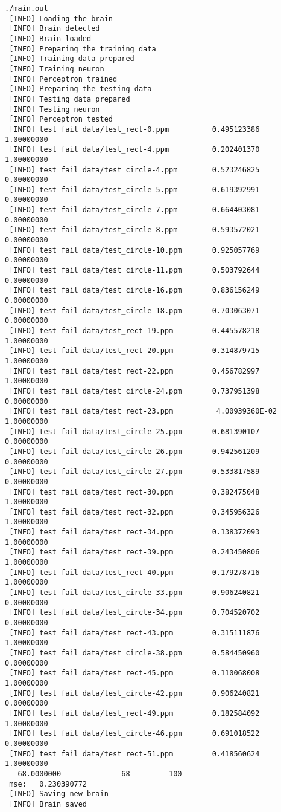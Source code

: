 \begin{verbatim}
./main.out
 [INFO] Loading the brain
 [INFO] Brain detected
 [INFO] Brain loaded
 [INFO] Preparing the training data
 [INFO] Training data prepared
 [INFO] Training neuron
 [INFO] Perceptron trained
 [INFO] Preparing the testing data
 [INFO] Testing data prepared
 [INFO] Testing neuron
 [INFO] Perceptron tested
 [INFO] test fail data/test_rect-0.ppm          0.495123386       1.00000000    
 [INFO] test fail data/test_rect-4.ppm          0.202401370       1.00000000    
 [INFO] test fail data/test_circle-4.ppm        0.523246825       0.00000000    
 [INFO] test fail data/test_circle-5.ppm        0.619392991       0.00000000    
 [INFO] test fail data/test_circle-7.ppm        0.664403081       0.00000000    
 [INFO] test fail data/test_circle-8.ppm        0.593572021       0.00000000    
 [INFO] test fail data/test_circle-10.ppm       0.925057769       0.00000000    
 [INFO] test fail data/test_circle-11.ppm       0.503792644       0.00000000    
 [INFO] test fail data/test_circle-16.ppm       0.836156249       0.00000000    
 [INFO] test fail data/test_circle-18.ppm       0.703063071       0.00000000    
 [INFO] test fail data/test_rect-19.ppm         0.445578218       1.00000000    
 [INFO] test fail data/test_rect-20.ppm         0.314879715       1.00000000    
 [INFO] test fail data/test_rect-22.ppm         0.456782997       1.00000000    
 [INFO] test fail data/test_circle-24.ppm       0.737951398       0.00000000    
 [INFO] test fail data/test_rect-23.ppm          4.00939360E-02   1.00000000    
 [INFO] test fail data/test_circle-25.ppm       0.681390107       0.00000000    
 [INFO] test fail data/test_circle-26.ppm       0.942561209       0.00000000    
 [INFO] test fail data/test_circle-27.ppm       0.533817589       0.00000000    
 [INFO] test fail data/test_rect-30.ppm         0.382475048       1.00000000    
 [INFO] test fail data/test_rect-32.ppm         0.345956326       1.00000000    
 [INFO] test fail data/test_rect-34.ppm         0.138372093       1.00000000    
 [INFO] test fail data/test_rect-39.ppm         0.243450806       1.00000000    
 [INFO] test fail data/test_rect-40.ppm         0.179278716       1.00000000    
 [INFO] test fail data/test_circle-33.ppm       0.906240821       0.00000000    
 [INFO] test fail data/test_circle-34.ppm       0.704520702       0.00000000    
 [INFO] test fail data/test_rect-43.ppm         0.315111876       1.00000000    
 [INFO] test fail data/test_circle-38.ppm       0.584450960       0.00000000    
 [INFO] test fail data/test_rect-45.ppm         0.110068008       1.00000000    
 [INFO] test fail data/test_circle-42.ppm       0.906240821       0.00000000    
 [INFO] test fail data/test_rect-49.ppm         0.182584092       1.00000000    
 [INFO] test fail data/test_circle-46.ppm       0.691018522       0.00000000    
 [INFO] test fail data/test_rect-51.ppm         0.418560624       1.00000000    
   68.0000000              68         100
 mse:   0.230390772    
 [INFO] Saving new brain
 [INFO] Brain saved
\end{verbatim}
\newpage
